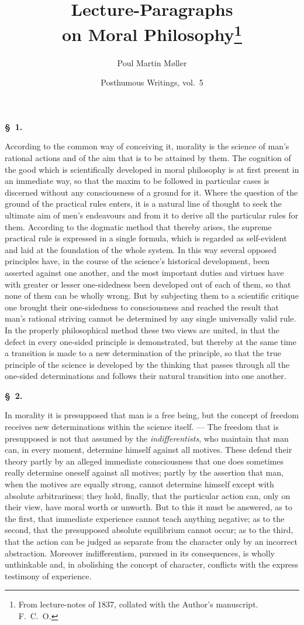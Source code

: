 \documentclass[12pt]{article}
\title{\textbf{Lecture-Paragraphs\\[0.2em] on Moral Philosophy}\footnote{From lecture-notes of 1837, collated with the Author's manuscript. F.\ C.\ O.}}
\author{Poul Martin Møller}
\date{Posthumous Writings, vol.\ 5}
\newcommand{\opage}[1]{\marginnote{\footnotesize\textit{[#1]}}}
\newcommand{\slaw}[1]{\par\medskip\begin{center}\textbf{\S~#1.}\end{center}\nopagebreak}
\begin{document}
\maketitle

\slaw{1}
\opage{141}According to the common way of conceiving it, morality is the science of man's rational actions and of the aim that is to be attained by them. The cognition of the good which is scientifically developed in moral philosophy is at first present in an immediate way, so that the maxim to be followed in particular cases is discerned without any consciousness of a ground for it. Where the question of the ground of the practical rules enters, it is a natural line of thought to seek the ultimate aim of men's endeavours and from it to derive all the particular rules for them. According to the dogmatic method that thereby arises, the supreme practical rule is expressed in a single formula, which is regarded as self-evident and laid at the foundation of the whole system. In this way several opposed principles have, in the course of the science's historical development, been asserted against one another, and the most important duties and virtues have with greater or lesser one-sidedness been developed out of each of them, so that none of them can be wholly wrong. But by subjecting them to a scientific critique one brought their one-sidedness to consciousness and reached the result that man's rational striving cannot be determined by any single universally valid rule. In the properly philosophical method these two views are united, in that the defect in every one-sided principle is demonstrated, but thereby at the same time a transition is made to a new determination of the principle, so that the true principle of the science is de\opage{142}veloped by the thinking that passes through all the one-sided determinations and follows their natural transition into one another.

\slaw{2}
In morality it is presupposed that man is a free being, but the concept of freedom receives new determinations within the science itself. --- The freedom that is presupposed is not that assumed by the \emph{indifferentists}, who maintain that man can, in every moment, determine himself against all motives. These defend their theory partly by an alleged immediate consciousness that one does sometimes really determine oneself against all motives; partly by the assertion that man, when the motives are equally strong, cannot determine himself except with absolute arbitrariness; they hold, finally, that the particular action can, only on their view, have moral worth or unworth. But to this it must be answered, as to the first, that immediate experience cannot teach anything negative; as to the second, that the presupposed absolute equilibrium cannot occur; as to the third, that the action can be judged as separate from the character only by an incorrect abstraction. Moreover indifferentism, pursued in its consequences, is wholly unthinkable and, in abolishing the concept of character, conflicts with the express testimony of experience.
\end{document}
